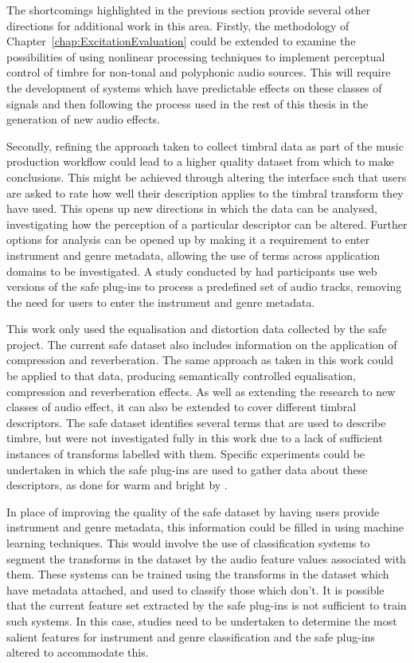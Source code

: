 	The shortcomings highlighted in the previous section provide several other directions for additional work in this
	area. Firstly, the methodology of Chapter~\ref{chap:ExcitationEvaluation} could be extended to examine the
	possibilities of using nonlinear processing techniques to implement perceptual control of timbre for non-tonal and
	polyphonic audio sources. This will require the development of systems which have predictable effects on these
	classes of signals and then following the process used in the rest of this thesis in the generation of new audio
	effects.
	
	Secondly, refining the approach taken to collect timbral data as part of the music production workflow could
	lead to a higher quality dataset from which to make conclusions. This might be achieved through altering the
	interface such that users are asked to rate how well their description applies to the timbral transform they have
	used. This opens up new directions in which the data can be analysed, investigating how the perception of a
	particular descriptor can be altered. Further options for analysis can be opened up by making it a requirement to
	enter instrument and genre metadata, allowing the use of terms across application domains to be investigated. A study
	conducted by \citet{stasis2017audio} had participants use web versions of the \acrshort{safe} plug-ins to process a
	predefined set of audio tracks, removing the need for users to enter the instrument and genre metadata.

	This work only used the equalisation and distortion data collected by the \acrshort{safe} project. The current
	\acrshort{safe} dataset also includes information on the application of compression and reverberation. The same
	approach as taken in this work could be applied to that data, producing semantically controlled equalisation,
	compression and reverberation effects. As well as extending the research to new classes of audio effect, it can also
	be extended to cover different timbral descriptors. The \acrshort{safe} dataset identifies several terms that are
	used to describe timbre, but were not investigated fully in this work due to a lack of sufficient instances of
	transforms labelled with them. Specific experiments could be undertaken in which the \acrshort{safe} plug-ins are
	used to gather data about these descriptors, as done for warm and bright by \citet{stasis2015a}.

	In place of improving the quality of the \acrshort{safe} dataset by having users provide instrument and genre
	metadata, this information could be filled in using machine learning techniques. This would involve the use of
	classification systems to segment the transforms in the dataset by the audio feature values associated with them.
	These systems can be trained using the transforms in the dataset which have metadata attached, and used to classify
	those which don't.  It is possible that the current feature set extracted by the \acrshort{safe} plug-ins is not
	sufficient to train such systems.  In this case, studies need to be undertaken to determine the most salient
	features for instrument and genre classification and the \acrshort{safe} plug-ins altered to accommodate this.

